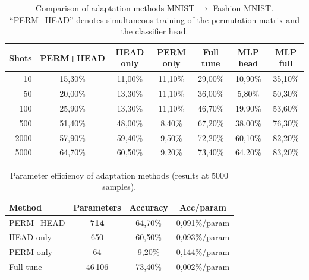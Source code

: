 \begin{table}[htbp]
\centering
\caption{Comparison of adaptation methods MNIST $\to$ Fashion-MNIST. ``PERM+HEAD'' denotes simultaneous training of the permutation matrix and the classifier head.}
\label{tab:perm_head_fewshot}
\begin{tabular}{r|c|c|c|c|c|c}
\hline
\textbf{Shots} & \textbf{PERM+HEAD} & \textbf{HEAD only} & \textbf{PERM only} & \textbf{Full tune} & \textbf{MLP head} & \textbf{MLP full} \\
\hline
10   & 15{,}30\% & 11{,}00\% & 11{,}10\% & 29{,}00\% & 10{,}90\% & 35{,}10\% \\
50   & 20{,}00\% & 13{,}30\% & 11{,}10\% & 36{,}00\% &  5{,}80\% & 50{,}30\% \\
100  & 25{,}90\% & 13{,}30\% & 11{,}10\% & 46{,}70\% & 19{,}90\% & 53{,}60\% \\
500  & 51{,}40\% & 48{,}00\% &  8{,}40\% & 67{,}20\% & 38{,}00\% & 76{,}30\% \\
2000 & 57{,}90\% & 59{,}40\% &  9{,}50\% & 72{,}20\% & 60{,}10\% & 82{,}20\% \\
5000 & 64{,}70\% & 60{,}50\% &  9{,}20\% & 73{,}40\% & 64{,}20\% & 83{,}20\% \\
\hline
\end{tabular}
\end{table}

\begin{table}[htbp]
\centering
\caption{Parameter efficiency of adaptation methods (results at 5000 samples).}
\label{tab:param_efficiency}
\begin{tabular}{l|c|c|c}
\hline
\textbf{Method} & \textbf{Parameters} & \textbf{Accuracy} & \textbf{Acc/param} \\
\hline
PERM+HEAD  & \textbf{714}   & 64{,}70\% & 0{,}091\%/param \\
HEAD only  & 650   & 60{,}50\% & 0{,}093\%/param \\
PERM only  & 64    & 9{,}20\%  & 0{,}144\%/param \\
Full tune  & 46\,106 & 73{,}40\% & 0{,}002\%/param \\
\hline
\end{tabular}
\end{table}

